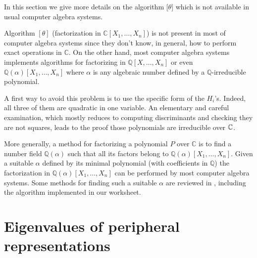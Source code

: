 In this section we give more details on the algorithm [$\theta$] which is not available
in usual computer algebra systems.

Algorithm $[ \theta ]$ (factorization in $\mathbb{C} [ X_{1} , \ldots ,X_{n}
]$) is not present in most of computer algebra systems since they
don't know, in general, how to perform exact operations in
$\mathbb{C}$. On the other hand, most computer algebra systems implements algorithms for factorizing in
$\mathbb{Q} [ X, \ldots ,X_{n} ]$ or even $\mathbb{Q} ( \alpha ) [ X_{1} ,
\ldots ,X_{n} ]$ where $\alpha$ is any algebraic number defined by a
$\mathbb{Q}$-irreducible polynomial.

A first way to avoid this problem is to use the specific form of the $H_i$'s. Indeed, all three of them are quadratic in one variable. An elementary and careful examination, which mostly reduces to computing discriminants and checking they are not squares, leads to the proof those polynomials are irreducible over $\mathbb{C}$.

More generally, a method for factorizing a polynomial $P$ over $\mathbb C$ is to find a number field
$\mathbb{Q} ( \alpha )$ such that all its factors belong to $\mathbb{Q} (
\alpha ) [ X_{1} , \ldots ,X_{n} ]$. Given a suitable $\alpha$ defined by its
minimal polynomial (with coefficients in $\mathbb{Q}$) the factorization in
$\mathbb{Q} ( \alpha ) [ X_{1} , \ldots ,X_{n} ]$ can be performed by most
computer algebra systems. Some methods for finding such a suitable $\alpha$
are reviewed in \cite{Rag97}, including the algorithm implemented in our worksheet.

\section{Eigenvalues of peripheral representations}\label{s:A-var}

